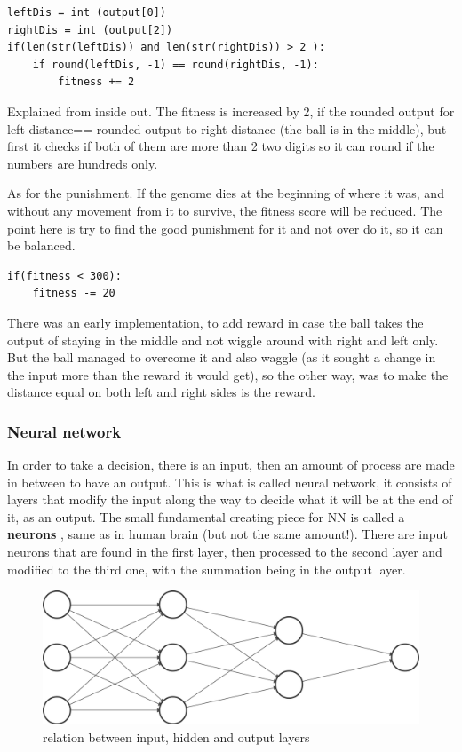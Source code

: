 \begin{listing}[H]
\begin{verbatim}
leftDis = int (output[0])
rightDis = int (output[2])
if(len(str(leftDis)) and len(str(rightDis)) > 2 ):
	if round(leftDis, -1) == round(rightDis, -1):
		fitness += 2
\end{verbatim}
\end{listing}

Explained from inside out. The fitness is increased by 2, if the rounded output for left distance== rounded output to right distance (the ball is in the middle), but first it checks if both of them are more than 2 two digits so it can round if the numbers are hundreds only.

As for the punishment. If the genome dies at the beginning of where it was, and without any movement from it to survive, the fitness score will be reduced. The point here is try to find the good punishment for it and not over do it, so it can be balanced.

\begin{listing}[H]
	\begin{verbatim}
if(fitness < 300):
	fitness -= 20
	\end{verbatim}
\end{listing}

There was an early implementation, to add reward in case the ball takes the output of staying in the middle and not wiggle around with right and left only. But the ball managed to overcome it and also waggle (as it sought a change in the input more than the reward it would get), so the other way, was to make the distance equal on both left and right sides is the reward.

\subsubsection{Neural network}
In order to take a decision, there is an input, then an amount of process are made in between to have an output. This is what is called neural network, it consists of layers that modify the input along the way to decide what it will be at the end of it, as an output. The small fundamental creating piece for NN is called a \textbf{neurons} , same as in human brain (but not the same amount!). There are input neurons that are found in the first layer, then processed to the second layer and modified to the third one, with the summation being in the output layer.

\begin{figure}
	\centering
	\includegraphics[width=0.7\linewidth]{usedImages/nn}
	\caption{relation between input, hidden and output layers}
	\label{fig:nn}
\end{figure}

